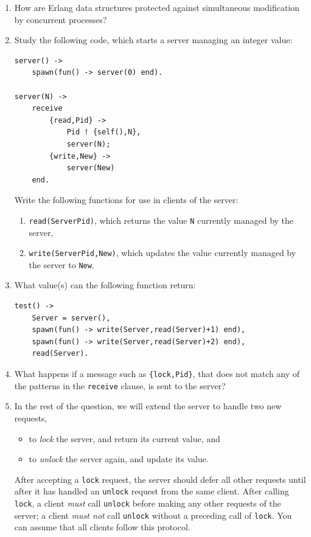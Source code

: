 \documentclass{article}
\begin{document}
\begin{enumerate}
\item
How are Erlang data structures protected against simultaneous
modification by concurrent processes?

\item
Study the following code, which starts a server managing an integer value:
\begin{verbatim}
server() ->
    spawn(fun() -> server(0) end).

server(N) ->
    receive
        {read,Pid} ->
            Pid ! {self(),N},
            server(N);
        {write,New} ->
            server(New)
    end.
\end{verbatim}
Write the following functions for use in clients of the server:
\begin{enumerate}
\item
\verb!read(ServerPid)!, which returns the value \verb!N! currently managed by the server,
\item
\verb!write(ServerPid,New)!, which updates the value currently managed by the server to \verb!New!.
\end{enumerate}

\item
What value(s) can the following function return:
\begin{verbatim}
test() ->
    Server = server(),
    spawn(fun() -> write(Server,read(Server)+1) end),
    spawn(fun() -> write(Server,read(Server)+2) end),
    read(Server).
\end{verbatim}

\item
What happens if a message such as \verb!{lock,Pid}!, that does not
match any of the patterns in the \verb!receive! clause, is sent to the
server?

\item
In the rest of the question, we will extend the server to handle two
new requests,
\begin{itemize}
\item to {\em lock} the server, and return its current value, and
\item to {\em unlock} the server again, and update its value.
\end{itemize}
After accepting a \verb!lock! request, the server should defer all
other requests until after it has handled an \verb!unlock! request
from the same client. After calling \verb!lock!, a client {\em must}
call \verb!unlock! before making any other requests of the server; a
client {\em must not} call \verb!unlock! without a preceding call of
\verb!lock!. You can assume that all clients follow this protocol.


\end{enumerate}
\end{document}
